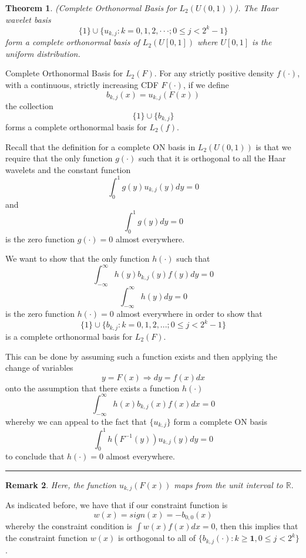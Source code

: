 \documentclass[twoside]{article}
\newcounter{lecnum}
\newtheorem{theorem}{Theorem}[lecnum]
\newtheorem{remark}[theorem]{Remark}
\newenvironment{proof}{{\bf Proof:}}{\hfill\rule{2mm}{2mm}}
\newcommand{\real}{\mathbb{R}}
\begin{document}
\begin{theorem}(Complete Orthonormal Basis for $L_2(U(0,1))$). The Haar wavelet basis 
$$
\{1\} \cup \{u_{k,j}: k=0,1,2,\cdot \cdot \cdot; 0 \leq j < 2^{k}-1\}
$$
form a complete orthonormal basis of $L_2(U[0,1])$ where $U[0,1]$ is the uniform distribution.
\end{theorem}

\begin{theorem_exam}{Complete Orthonormal Basis for $L_2(F)$.}{} For any strictly positive density $f(\cdot)$, with a continuous, strictly increasing CDF $F(\cdot)$, if we define 
\begin{equation}
  b_{k,j}(x) = u_{k,j}(F(x))
\end{equation}
the collection 
$$
\{1\} \cup \{b_{k,j}\}
$$
forms a complete orthonormal basis for $L_2(f).$
\end{theorem_exam}

\begin{proof} Recall that the definition for a complete ON basis in $L_2(U(0,1))$ is that we require that the only function $g(\cdot)$ such that it is orthogonal to all the Haar wavelets and the constant function
$$
\int_{0}^{1}g(y)u_{k,j}(y)dy = 0
$$
and 
$$
\int_{0}^{1}g(y)dy = 0
$$
is the zero function $g(\cdot) = 0$ almost everywhere.

We want to show that the only function $h(\cdot)$ such that 
$$
\int_{-\infty}^{\infty}h(y)b_{k,j}(y)f(y)dy = 0
$$
$$
\int_{-\infty}^{\infty}h(y)dy = 0
$$
is the zero function $h(\cdot) = 0$ almost everywhere in order to show that 
$$
\{1\} \cup \{b_{k,j}: k=0,1,2,...; 0 \leq j < 2^{k}-1\}
$$
is a complete orthonormal basis for $L_2(F).$

This can be done by assuming such a function exists and then applying the change of variables
$$
y = F(x) \Rightarrow dy = f(x)dx
$$
onto the assumption that there exists a function $h(\cdot)$
$$
\int_{-\infty}^{\infty}h(x)b_{k,j}(x)f(x)dx = 0
$$
whereby we can appeal to the fact that $\{u_{k,j}\}$ form a complete ON basis 
$$
\int_{0}^{1}h(F^{-1}(y))u_{k,j}(y)dy = 0
$$
to conclude that $h(\cdot) = 0$ almost everywhere.
\end{proof}

\begin{remark} Here, the function $u_{k,j}(F(x))$ maps from the unit interval to $\real.$
\end{remark}

As indicated before, we have that if our constraint function is
$$
w(x) = sign(x) = -b_{0,0}(x)
$$
whereby the constraint condition is $\int w(x)f(x)dx = 0$, then this implies that the constraint function $w(x)$ is orthogonal to all of $\{b_{k,j}(\cdot): k \geq \bm{1}, 0 \leq j < 2^k\}$.
\end{document}
